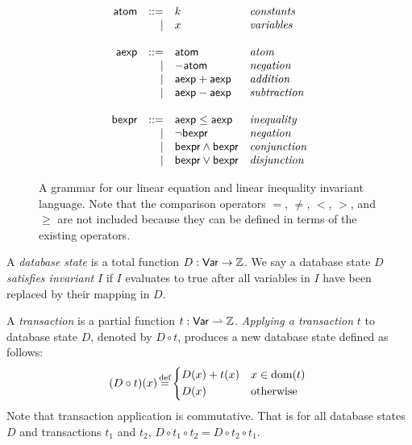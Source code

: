 \begin{figure}[h]
  \centering

  \newcommand{\atom}{\textsf{atom}}
  \newcommand{\aexp}{\textsf{aexp}}
  \newcommand{\bexp}{\textsf{bexpr}}
  \begin{gather*}
    \begin{array}{rrll}
      \atom & ::= & k & \text{\emph{constants}} \\
            & |   & x & \text{\emph{variables}} \\
      &&& \\
      \aexp  & ::= & \atom         & \text{\emph{atom}} \\
             & |   & -\atom        & \text{\emph{negation}} \\
             & |   & \aexp + \aexp & \text{\emph{addition}} \\
             & |   & \aexp - \aexp & \text{\emph{subtraction}} \\
      &&& \\
      \bexp  & ::= & \aexp \leq \aexp  & \text{\emph{inequality}} \\
             & |   & \lnot \bexp       & \text{\emph{negation}} \\
             & |   & \bexp \land \bexp & \text{\emph{conjunction}} \\
             & |   & \bexp \lor \bexp  & \text{\emph{disjunction}} \\
    \end{array}
  \end{gather*}

  \caption{
    A grammar for our linear equation and linear inequality invariant language.
    Note that the comparison operators $=$, $\neq$, $<$, $>$, and $\geq$ are
    not included because they can be defined in terms of the existing
    operators.
  }
  \label{fig:invariant-grammar}
\end{figure}

A \emph{database state} is a total function $D: \textsf{Var} \to \mathbb{Z}$.  We say a
database state $D$ \emph{satisfies invariant} $I$ if $I$ evaluates to true
after all variables in $I$ have been replaced by their mapping in $D$.

A \emph{transaction} is a partial function $t: \textsf{Var} \rightharpoonup \mathbb{Z}$.
\emph{Applying a transaction} $t$ to database state $D$, denoted by $D \circ
t$, produces a new database state defined as follows:
\[
  (D \circ t)(x) \defeq \begin{cases*}
    D(x) + t(x) & $x \in \dom{}(t)$ \\
    D(x)        & otherwise
  \end{cases*}
\]
Note that transaction application is commutative. That is for all database
states $D$ and transactions $t_1$ and $t_2$, $D \circ t_1 \circ t_2 = D \circ
t_2 \circ t_1$.

